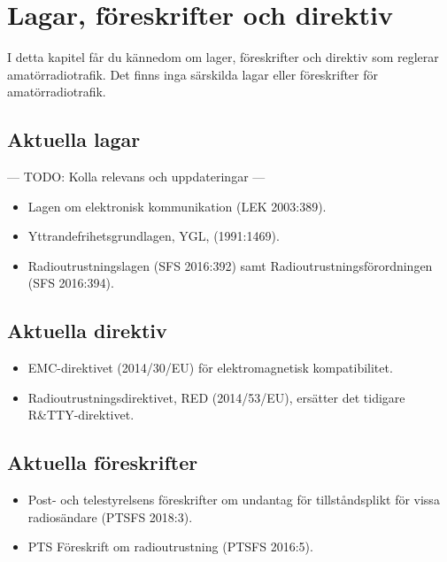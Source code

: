 \section{Lagar, föreskrifter och direktiv}

I detta kapitel får du kännedom om lager, föreskrifter och direktiv som reglerar amatörradiotrafik. Det finns inga särskilda lagar eller föreskrifter för amatörradiotrafik.

\subsection{Aktuella lagar}

--- TODO: Kolla relevans och uppdateringar ---

\begin{itemize}
	\item Lagen om elektronisk kommunikation (LEK 2003:389).
	
	\item Yttrandefrihetsgrundlagen, YGL, (1991:1469).
	
	\item Radioutrustningslagen (SFS 2016:392) samt Radioutrustningsförordningen (SFS 2016:394).
	
\end{itemize}

\subsection{Aktuella direktiv}

\begin{itemize}
	\item EMC-direktivet (2014/30/EU) för elektromagnetisk kompatibilitet.
	
	\item Radioutrustningsdirektivet, RED (2014/53/EU), ersätter det tidigare R\&TTY-direktivet.
\end{itemize}

\subsection{Aktuella föreskrifter}

\begin{itemize}
	\item Post- och telestyrelsens föreskrifter om undantag för tillståndsplikt för vissa radiosändare (PTSFS 2018:3).
	
	\item PTS Föreskrift om radioutrustning (PTSFS 2016:5).
\end{itemize}

